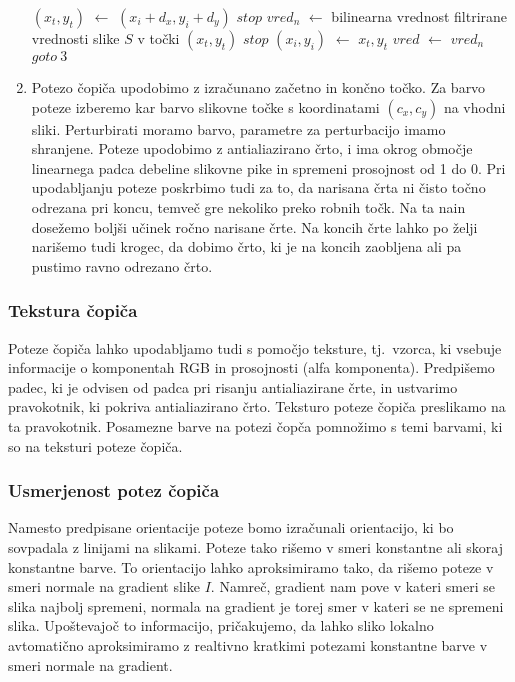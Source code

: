 \begin{enumerate}
\begin{algorithm}
\begin{algorithmic}[1]
  \State $(x_t, y_t)$ $\leftarrow$ $(x_i + d_x, y_i + d_y)$
    \State $stop$
  \EndIf
  \State $vred_n$ $\leftarrow$ bilinearna vrednost filtrirane vrednosti slike $S$ v točki $(x_t, y_t)$
    \State $stop$
  \EndIf
  \State $(x_i, y_i)$ $\leftarrow$ $x_t, y_t$
  \State $vred$ $\leftarrow$ $vred_n$
  \State $goto\ 3$ 
\end{algorithmic}
\end{algorithm}
%
  \item Potezo čopiča upodobimo z izračunano začetno in končno točko. Za barvo poteze izberemo kar barvo slikovne točke s koordinatami $(c_x, c_y)$ na vhodni sliki. Perturbirati moramo barvo, parametre za perturbacijo imamo shranjene. Poteze upodobimo z antialiazirano črto, i ima okrog območje linearnega padca debeline slikovne pike in spremeni prosojnost od 1 do 0. Pri upodabljanju poteze poskrbimo tudi za to, da narisana črta ni čisto točno odrezana pri koncu, temveč gre nekoliko preko robnih točk. Na ta nain dosežemo boljši učinek ročno narisane črte. Na koncih črte lahko po želji narišemo tudi krogec, da dobimo črto, ki je na koncih zaobljena ali pa pustimo ravno odrezano črto.
\end{enumerate}
%
\subsubsection{Tekstura čopiča}
Poteze čopiča lahko upodabljamo tudi s pomočjo teksture, tj.\ vzorca, ki vsebuje informacije o komponentah RGB in prosojnosti (alfa komponenta). Predpišemo padec, ki je odvisen od padca pri risanju antialiazirane črte, in ustvarimo pravokotnik, ki pokriva antialiazirano črto. Teksturo poteze čopiča preslikamo na ta pravokotnik. Posamezne barve na potezi čopča pomnožimo s temi barvami, ki so na teksturi poteze čopiča.
\subsubsection{Usmerjenost potez čopiča}
Namesto predpisane orientacije poteze bomo izračunali orientacijo, ki bo sovpadala z linijami na slikami. Poteze tako rišemo v smeri konstantne ali skoraj konstantne barve. To orientacijo lahko aproksimiramo tako, da rišemo poteze v smeri normale na gradient slike $I$. Namreč, gradient nam pove v kateri smeri se slika najbolj spremeni, normala na gradient je torej smer v kateri se ne spremeni slika. Upoštevajoč to informacijo, pričakujemo, da lahko sliko lokalno avtomatično aproksimiramo z realtivno kratkimi potezami konstantne barve v smeri normale na gradient.

